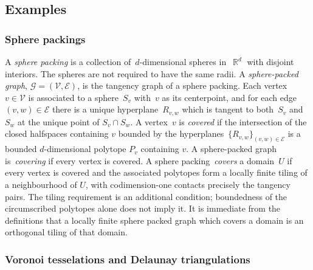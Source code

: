 \documentclass[12pt]{amsart}
\numberwithin{equation}{section}
\DeclareMathOperator{\R}{\mathbb{R}}
\newcommand{\G}{\mathcal{G}}
\newcommand{\V}{\mathcal{V}}
\newcommand{\E}{\mathcal{E}}
\begin{document}
\subsection{Examples}
\label{subsec:natural-examples}

\subsubsection{Sphere packings}

A \emph{sphere packing} is a collection of~$d$-dimensional spheres in~$\R^d$ with disjoint interiors. The spheres are not required to have the same radii. A \emph{sphere-packed graph}, $\G = (\V,\E)$, is the tangency graph of a sphere packing. Each vertex~$v \in \V$ is associated to a sphere~$S_v$ with~$v$ as its centerpoint, and for each edge~$(v, w) \in \E$ there is a unique 
hyperplane~$R_{v,w}$ which is tangent to both~$S_v$ and~$S_w$ at the unique point of $S_v\cap S_w$. A vertex~$v$ is \emph{covered} if 
the intersection of the closed halfspaces containing $v$ bounded by the hyperplanes~$\{R_{v,w}\}_{(v,w) \in \E}$ is a bounded $d$-dimensional polytope $P_v$ containing $v$. A sphere-packed graph is~\emph{covering} if every vertex is covered. A sphere packing~\emph{covers} a domain~$U$ 
if every vertex is covered and the associated polytopes form a locally finite tiling of a neighbourhood of $U$, with codimension-one contacts precisely the tangency pairs. The tiling requirement is an additional condition; boundedness of the circumscribed polytopes alone does not imply it. 
It is immediate from the definitions that a locally finite sphere packed graph which covers a domain is an orthogonal tiling of that domain. 



\subsubsection{Voronoi tesselations and Delaunay triangulations}
\end{document}

